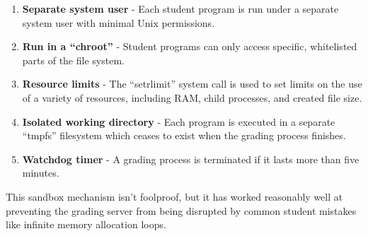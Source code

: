 \begin{enumerate}
\item \textbf{Separate system user} - Each student program is run under 
  a separate system user with minimal Unix permissions.
\item \textbf{Run in a ``chroot''} - Student programs can only access
  specific, whitelisted parts of the file system.
\item \textbf{Resource limits} - The ``setrlimit'' system call is used to
  set limits on the use of a variety of resources, including RAM, child
  processes, and created file size.
\item \textbf{Isolated working directory} - Each program is executed in
  a separate ``tmpfs'' filesystem which ceases to exist when the grading
  process finishes.
\item \textbf{Watchdog timer} - A grading process is terminated if it lasts
  more than five minutes.
\end{enumerate}

This sandbox mechanism isn't foolproof, but it has worked reasonably    %
well at preventing the grading server from being disrupted by common
student mistakes like infinite memory allocation loops.
